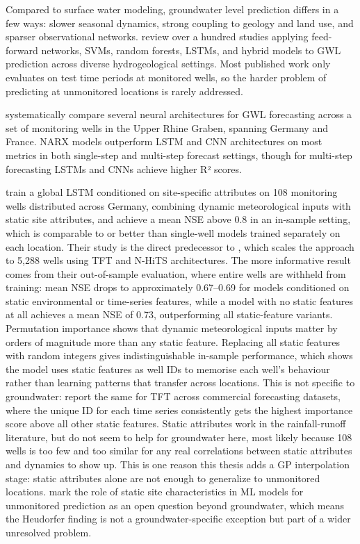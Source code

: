 Compared to surface water modeling, groundwater level prediction differs in a few ways: slower seasonal dynamics, strong coupling to geology and land use, and sparser
observational networks. \citet{heddam2022kriging} review over a hundred studies applying
feed-forward networks, SVMs, random forests, LSTMs, and hybrid models to GWL prediction
across diverse hydrogeological settings.
Most published work only evaluates on test time periods at monitored wells, so the harder problem of predicting at unmonitored locations is rarely addressed.

\citet{wunsch2021groundwater} systematically compare several neural architectures for GWL forecasting across a set of monitoring wells in the Upper Rhine Graben, spanning Germany and France.
NARX models outperform LSTM and CNN architectures on most metrics in both single-step and multi-step forecast settings, though for multi-step forecasting LSTMs and CNNs achieve higher R² scores.

\citet{heudorfer2024challenges} train a global LSTM conditioned on site-specific attributes on 108 monitoring wells
distributed across Germany, combining dynamic meteorological inputs with static site
attributes, and achieve a mean NSE above 0.8 in an in-sample setting, which is comparable to or better than single-well models trained separately on each location. Their study is
the direct predecessor to \citet{kunz2025}, which scales the approach to 5{,}288 wells using
TFT and N-HiTS architectures. The more informative result comes from their out-of-sample
evaluation, where entire wells are withheld from training: mean NSE drops to approximately
0.67--0.69 for models conditioned on static environmental or time-series features, while a
model with no static features at all achieves a mean NSE of 0.73, outperforming all
static-feature variants. Permutation importance shows that dynamic meteorological inputs matter by orders of magnitude more than any static feature.
Replacing all static features with random integers gives indistinguishable in-sample performance, which shows the model uses static features as well IDs to memorise each well's behaviour rather than learning patterns that transfer across locations. This is not specific to groundwater: \citet{lim2021temporal}
report the same for TFT across commercial forecasting datasets, where the unique ID for each time series consistently gets the highest importance score above all other static features.
Static attributes work in the rainfall-runoff literature, but do not seem to help for groundwater here, most likely because 108 wells is too few and too similar for any real correlations between static attributes and dynamics to show up. This is one reason this thesis adds a GP interpolation stage: static attributes alone are not enough to generalize to unmonitored locations.
\citet{willard2023time} mark the role of static site characteristics in ML models for
unmonitored prediction as an open question beyond groundwater, which
means the Heudorfer finding is not a groundwater-specific exception but part of a wider unresolved problem.

